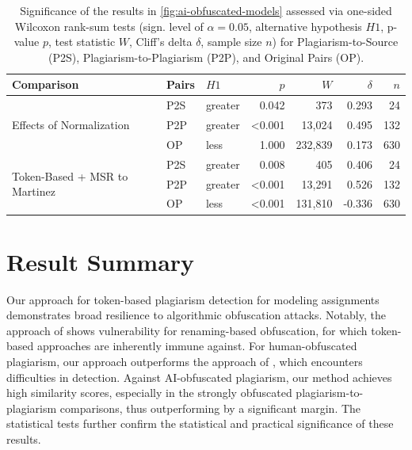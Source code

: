 \begin{table}%
	\centering
	\begin{tabular}{lllrrrr}
		\toprule
		Comparison                                                  & Pairs & $H1$  & $p$         & $W$     & $\delta$ &   $n$  \\
		\midrule
		\multirow{3}{*}{Effects of Normalization}           & P2S & greater &  0.042  & 373     & 0.293         & 24         \\
		                                                              & P2P & greater & <0.001  & 13,024  & 0.495         & 132       \\
		                                                              & OP  & less    & 1.000   & 232,839 & 0.173         & 630    \\
		\midrule
		\multirow{3}{*}{{Token-Based + MSR to Martinez}}                  & P2S & greater & 0.008   & 405     & 0.406         & 24        \\
		                                                              & P2P & greater & <0.001  & 13,291  & 0.526         & 132        \\
		                                                              & OP  & less    & <0.001  & 131,810 & -0.336        & 630     \\
		\bottomrule
	\end{tabular}
    \caption[Significance: AI-based Obfuscation of Models]{Significance of the results in \autoref{fig:ai-obfuscated-models} assessed via one-sided Wilcoxon rank-sum tests (sign. level of $\alpha=0.05$, alternative hypothesis $H1$, p-value $p$, test statistic $W$, Cliff's delta $\delta$, sample size $n$) for Plagiarism-to-Source (P2S), Plagiarism-to-Plagiarism (P2P), and Original Pairs (OP).}
    \label{tab:significance-stats}
\end{table}

\section{Result Summary}\label{sec:mde-result-summary}
Our approach for token-based plagiarism detection for modeling assignments demonstrates broad resilience to algorithmic obfuscation attacks.
Notably, the approach of \citet{Martinez2020} shows vulnerability for renaming-based obfuscation, for which token-based approaches are inherently immune against.
For human-obfuscated plagiarism, our approach outperforms the approach of \citet{Martinez2020}, which encounters difficulties in detection.
Against AI-obfuscated plagiarism, our method achieves high similarity scores, especially in the strongly obfuscated plagiarism-to-plagiarism comparisons, thus outperforming \citet{Martinez2020} by a significant margin. The statistical tests further confirm the statistical and practical significance of these results.

